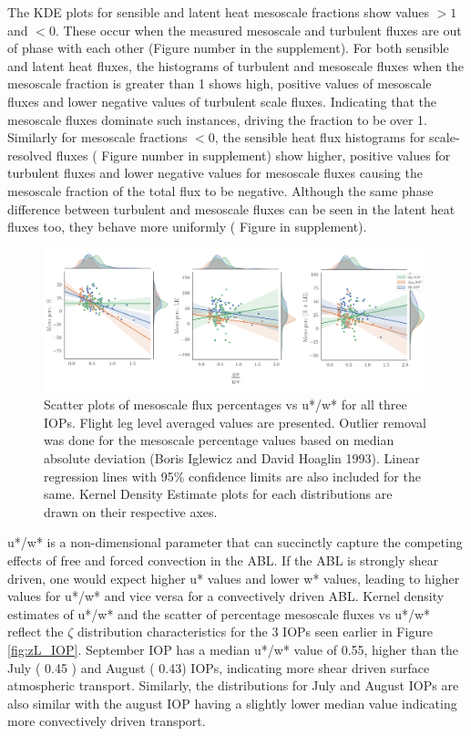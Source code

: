 \documentclass[draft]{agujournal2019}
\begin{document}
The KDE plots for sensible and latent heat mesoscale fractions show values $> 1$ and $< 0$. These occur when the measured mesoscale and turbulent fluxes are out of phase with each other (Figure number in the supplement). For both sensible and latent heat fluxes, the histograms of turbulent and mesoscale fluxes when the mesoscale fraction is greater than 1 shows high, positive values of mesoscale fluxes and lower negative values of turbulent scale fluxes. Indicating that the mesoscale fluxes dominate such instances, driving the fraction to be over 1. Similarly for mesoscale fractions $< 0$, the sensible heat flux histograms for scale-resolved fluxes ( Figure number in supplement) show higher, positive values for turbulent fluxes and lower negative values for mesoscale fluxes causing the mesoscale fraction of the total flux to be negative. Although the same phase difference between turbulent and mesoscale fluxes can be seen in the latent heat fluxes too, they behave more uniformly ( Figure in supplement).
 \begin{figure}[hbtp]
 \noindent\includegraphics[width=\textwidth]{figures_main/scatter_meso.png}
\caption{ Scatter plots of mesoscale flux percentages vs u*/w* for all three IOPs. Flight leg level averaged values are presented. Outlier removal was done for the mesoscale percentage values based on median absolute deviation (Boris Iglewicz and David Hoaglin 1993). Linear regression lines with 95\% confidence limits are also included for the same. Kernel Density Estimate plots for each distributions are drawn on their respective axes.}
\label{fig:scatter_meso}
 \end{figure}
 
u*/w* is a non-dimensional parameter that can succinctly capture the competing effects of free and forced convection in the ABL. If the ABL is strongly shear driven, one would expect higher u* values and lower w* values, leading to higher values for u*/w* and vice versa for a convectively driven ABL. Kernel density estimates of u*/w* and the scatter of percentage mesoscale fluxes vs u*/w* reflect the $\zeta$ distribution characteristics for the 3 IOPs seen earlier in Figure \ref{fig:zL_IOP}. September IOP has a median u*/w* value of 0.55, higher than the July ( 0.45 ) and August ( 0.43) IOPs, indicating more shear driven surface atmospheric transport. Similarly, the distributions for July and August IOPs are also similar with the august IOP having a slightly lower median value indicating more convectively driven transport.  
\end{document}
